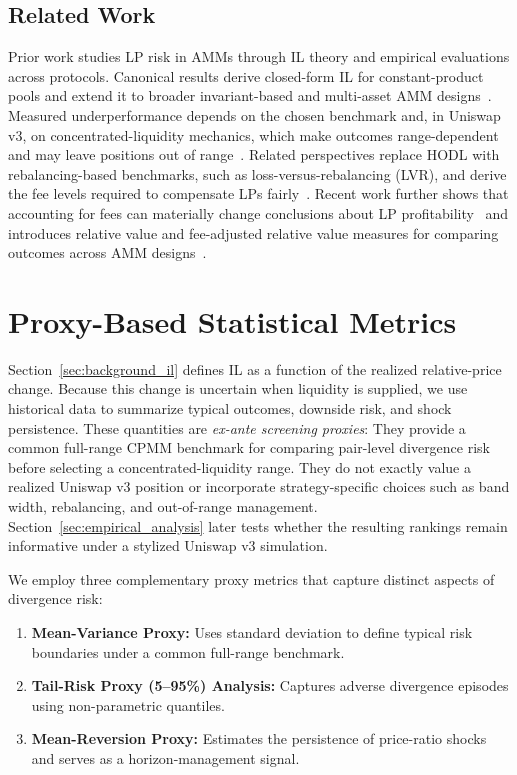 \documentclass[10pt,conference,compsocconf]{IEEEtran}
\begin{document}
\subsection{Related Work}
Prior work studies LP risk in AMMs through IL theory and empirical evaluations across protocols.
Canonical results derive closed-form IL for constant-product pools and extend it to broader invariant-based and multi-asset AMM designs~\cite{tiruviluamala2022general}.
Measured underperformance depends on the chosen benchmark and, in Uniswap v3, on concentrated-liquidity mechanics, which make outcomes range-dependent and may leave positions out of range~\cite{aigner2021uniswap,loesch2021impermanent,heimbach2022risks}.
Related perspectives replace HODL with rebalancing-based benchmarks, such as loss-versus-rebalancing (LVR), and derive the fee levels required to compensate LPs fairly~\cite{milionis2022quantifying,milionis2022automated,cohen2023inefficiency}.
Recent work further shows that accounting for fees can materially change conclusions about LP profitability~\cite{roman2025impact} and introduces relative value and fee-adjusted relative value measures for comparing outcomes across AMM designs~\cite{tangri2023generalizing}.


\section{Proxy-Based Statistical Metrics}
\label{sec:metrics}

Section~\ref{sec:background_il} defines IL as a function of the realized relative-price change. Because this change is uncertain when liquidity is supplied, we use historical data to summarize typical outcomes, downside risk, and shock persistence. These quantities are \emph{ex-ante screening proxies}: They provide a common full-range CPMM benchmark for comparing pair-level divergence risk before selecting a concentrated-liquidity range. They do not exactly value a realized Uniswap v3 position or incorporate strategy-specific choices such as band width, rebalancing, and out-of-range management. Section~\ref{sec:empirical_analysis} later tests whether the resulting rankings remain informative under a stylized Uniswap v3 simulation.

{We employ three complementary proxy metrics that capture distinct aspects of divergence risk:}
\begin{enumerate}
    \item \textbf{{Mean-Variance Proxy:}} {Uses standard deviation to define typical risk boundaries under a common full-range benchmark.}
    \item \textbf{{Tail-Risk Proxy (5--95\%) Analysis:}} {Captures adverse divergence episodes using non-parametric quantiles.}
    \item \textbf{{Mean-Reversion Proxy:}} {Estimates the persistence of price-ratio shocks and serves as a horizon-management signal.}
\end{enumerate}
\end{document}
